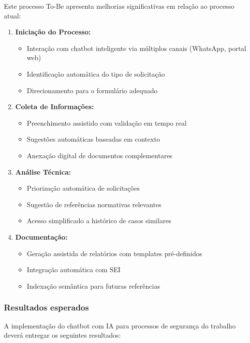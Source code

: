 \documentclass[12pt,a4paper]{article}
\begin{document}
Este processo To-Be apresenta melhorias significativas em relação ao processo atual:

\begin{enumerate}
    \item \textbf{Iniciação do Processo:}
    \begin{itemize}
        \item Interação com chatbot inteligente via múltiplos canais (WhatsApp, portal web)
        \item Identificação automática do tipo de solicitação
        \item Direcionamento para o formulário adequado
    \end{itemize}
    
    \item \textbf{Coleta de Informações:}
    \begin{itemize}
        \item Preenchimento assistido com validação em tempo real
        \item Sugestões automáticas baseadas em contexto
        \item Anexação digital de documentos complementares
    \end{itemize}
    
    \item \textbf{Análise Técnica:}
    \begin{itemize}
        \item Priorização automática de solicitações
        \item Sugestão de referências normativas relevantes
        \item Acesso simplificado a histórico de casos similares
    \end{itemize}
    
    \item \textbf{Documentação:}
    \begin{itemize}
        \item Geração assistida de relatórios com templates pré-definidos
        \item Integração automática com SEI
        \item Indexação semântica para futuras referências
    \end{itemize}
\end{enumerate}

\subsubsection{Resultados esperados}
A implementação do chatbot com IA para processos de segurança do trabalho deverá entregar os seguintes resultados:
\end{document}
